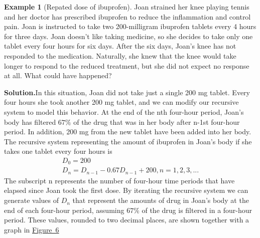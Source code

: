 \documentclass[10pt,]{book}
\theoremstyle{plain}
\theoremstyle{definition}
\theoremstyle{definition}
\newtheorem{example}[theorem]{Example}
\theoremstyle{definition}
\numberwithin{equation}{section}
\newlength{\panelmax}
\begin{document}
\begin{example}[Repated dose of ibuprofen]\label{example-2}
Joan strained her knee playing tennis and her doctor has prescribed ibuprofen to reduce the inflammation and control pain.  Joan is instructed to take two 200-milligram ibuprofen tablets every 4 hours for three days.  Joan doesn’t like taking medicine, so she decides to take only one tablet every four hours for six days.  After the six days, Joan’s knee has not responded to the medication.  Naturally, she knew that the knee would take longer to respond to the reduced treatment, but she did not expect no response at all.  What could have happened?%
\par\medskip\noindent%
\textbf{Solution.}\quad In this situation, Joan did not take just a single 200 mg tablet.  Every four hours she took another 200 mg tablet, and we can modify our recursive system to model this behavior. At the end of the nth four-hour period, Joan’s body has filtered \(67\%\) of the drug that was in her body after n-1st  four-hour period.  In addition, 200 mg from the new tablet have been added into her body.  The recursive system representing the amount of ibuprofen in Joan’s body if she takes one tablet every four hours is%
%
\begin{gather*}
D_0=200\\
D_n=D_{n-1} - 0.67D_{n-1} + 200, n=1,2,3,...
\end{gather*}
The subscript n represents the number of four-hour time periods that have elapsed since Joan took the first dose.  By iterating the recursive system we can generate values of \(D_n\) that represent the amounts of drug in Joan’s body at the end of each four-hour period, assuming  \(67\%\) of the drug is filtered in a four-hour period.  These values, rounded to two decimal places, are shown together with a graph in \hyperref[figure-plot-ibuprofen-multi-dose]{Figure~6}%
{%
\setlength{\panelmax}{0pt}
\newsavebox{\panelboxCimage}
\newlength{\phCimage}\setlength{\phCimage}{\ht\panelboxCimage+\dp\panelboxCimage}
}
\end{example}
\end{document}
